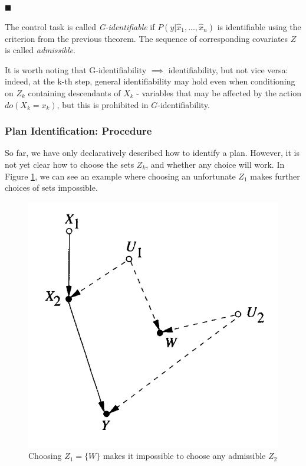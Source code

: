 \documentclass[fleqn]{article}
\numberwithin{equation}{section}
\numberwithin{theorem}{section}
\numberwithin{figure}{section}
\numberwithin{lemma}{section}
\numberwithin{corollary}{section}
\begin{document}
$\blacksquare$

The control task is called \textit{G-identifiable} if $P(y|\hat x_1,...,\hat x_n)$ is identifiable using the criterion from the previous theorem. The sequence of corresponding covariates $Z$ is called \textit{admissible}.

It is worth noting that G-identifiability $\implies$ identifiability, but not vice versa: indeed, at the k-th step, general identifiability may hold even when conditioning on $Z_k$ containing descendants of $X_k$ - variables that may be affected by the action $do(X_k=x_k)$, but this is prohibited in $G$-identifiability.

\subsubsection*{Plan Identification: Procedure}

So far, we have only declaratively described how to identify a plan. However, it is not yet clear how to choose the sets $Z_k$, and whether any choice will work. In Figure \ref{fig:bad_admissible_set}, we can see an example where choosing an unfortunate $Z_1$ makes further choices of sets impossible.

\begin{figure}[h]
	\begin{center}
		\includegraphics[scale=0.6]{imgs/img27.png}
	\end{center}
	\caption{Choosing $Z_1=\{W\}$ makes it impossible to choose any admissible $Z_2$}
	\label{fig:bad_admissible_set}
\end{figure}
\end{document}
